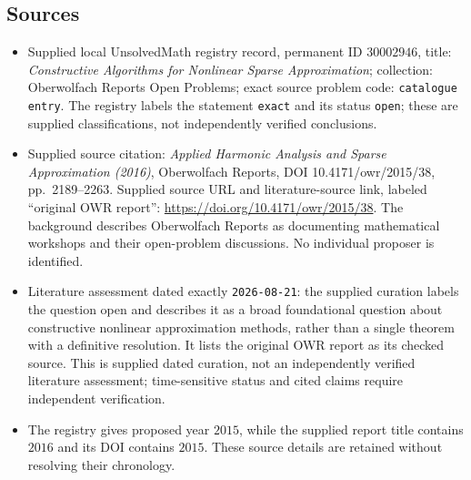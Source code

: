\documentclass[11pt]{article}
\begin{document}
\subsection{Sources}
\begin{itemize}
\item Supplied local UnsolvedMath registry record, permanent ID \(30002946\), title: \emph{Constructive Algorithms for Nonlinear Sparse Approximation}; collection: Oberwolfach Reports Open Problems; exact source problem code: \texttt{catalogue entry}. The registry labels the statement \texttt{exact} and its status \texttt{open}; these are supplied classifications, not independently verified conclusions.
\item Supplied source citation: \emph{Applied Harmonic Analysis and Sparse Approximation (2016)}, Oberwolfach Reports, DOI 10.4171/owr/2015/38, pp.\ 2189--2263. Supplied source URL and literature-source link, labeled ``original OWR report'': \url{https://doi.org/10.4171/owr/2015/38}. The background describes Oberwolfach Reports as documenting mathematical workshops and their open-problem discussions. No individual proposer is identified.
\item Literature assessment dated exactly \texttt{2026-08-21}: the supplied curation labels the question open and describes it as a broad foundational question about constructive nonlinear approximation methods, rather than a single theorem with a definitive resolution. It lists the original OWR report as its checked source. This is supplied dated curation, not an independently verified literature assessment; time-sensitive status and cited claims require independent verification.
\item The registry gives proposed year \(2015\), while the supplied report title contains \(2016\) and its DOI contains \(2015\). These source details are retained without resolving their chronology.
\end{itemize}
\end{document}
